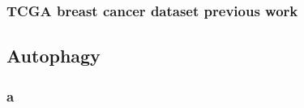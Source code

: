         \subsubsection{TCGA breast cancer dataset previous work}
        
        
        
        
    \subsection{Autophagy}
    


        \subsubsection{a}
